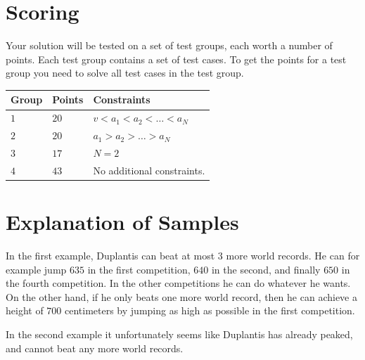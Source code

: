 \section*{Scoring}
Your solution will be tested on a set of test groups, each worth a number of points. Each test group contains
a set of test cases. To get the points for a test group you need to solve all test cases in the test group.

\noindent
\begin{tabular}{| l | l | p{12cm} |}
  \hline
  \textbf{Group} & \textbf{Points} & \textbf{Constraints} \\ \hline
  $1$    & $20$       & $v < a_1 < a_2 < \dots < a_N$ \\ \hline
  $2$    & $20$        & $a_1 > a_2 > \dots > a_N$ \\ \hline
  $3$    & $17$        & $N = 2$ \\ \hline
  $4$    & $43$       & No additional constraints. \\ \hline
\end{tabular}

\section*{Explanation of Samples}

In the first example, Duplantis can beat at most $3$ more world records. He can for example jump $635$ in the first competition, 
$640$ in the second, and finally $650$ in the fourth competition. In the other competitions he can do whatever he wants. 
On the other hand, if he only beats one more world record, then he can achieve a height of $700$ centimeters by jumping as high as possible
in the first competition.

In the second example it unfortunately seems like Duplantis has already peaked, and cannot beat any more world records.

